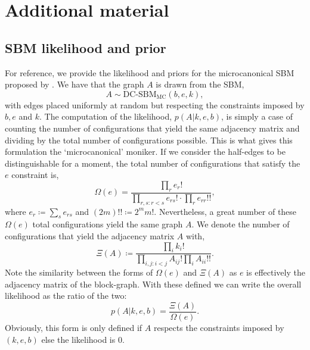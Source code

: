 \section{Additional material}

\subsection{SBM likelihood and prior}
\label{appdx:sbm}

For reference, we provide the likelihood and priors for the microcanonical SBM proposed by \citet{Peixoto-Bayesian-Microcanonical}. We have that the graph $A$ is drawn from the SBM,
%
\begin{equation}
	A \sim \textrm{DC-SBM}_{\textrm{MC}}(b, e, k),
\end{equation}
%
with edges placed uniformly at random but respecting the constraints imposed by $b, e$ and $k$. The computation of the likelihood, $p(A|k, e, b)$, is simply a case of counting the number of configurations that yield the same adjacency matrix and dividing by the total number of configurations possible. This is what gives this formulation the `microcanonical' moniker. If we consider the half-edges to be distinguishable for a moment, the total number of configurations that satisfy the $e$ constraint is,
%
\begin{equation}
	\Omega(e) = \frac{\prod_{r} e_r !}{\prod_{r,s : r < s} e_{rs}! \cdot \prod_{r} e_{rr}!!},
\end{equation}
%
where $e_r \coloneqq \sum_{s} e_{rs}$ and $(2m)!! \coloneqq 2^m m!$. Nevertheless, a great number of these $\Omega(e)$ total configurations yield the same graph $A$. We denote the number of configurations that yield the adjacency matrix $A$ with,
%
\begin{equation}
	\Xi(A) \coloneqq \frac{\prod_i k_i !}{\prod_{i,j : i < j} A_{ij} ! \prod_i A_{ii} !! }.
\end{equation}
%
Note the similarity between the forms of $\Omega(e)$ and $\Xi(A)$ as $e$ is effectively the adjacency matrix of the block-graph. With these defined we can write the overall likelihood as the ratio of the two:
%
\begin{equation}
	p(A|k,e,b) = \frac{\Xi(A)}{\Omega(e)}.
\end{equation}
%
Obviously, this form is only defined if $A$ respects the constraints imposed by $(k,e,b)$ else the likelihood is 0. 

